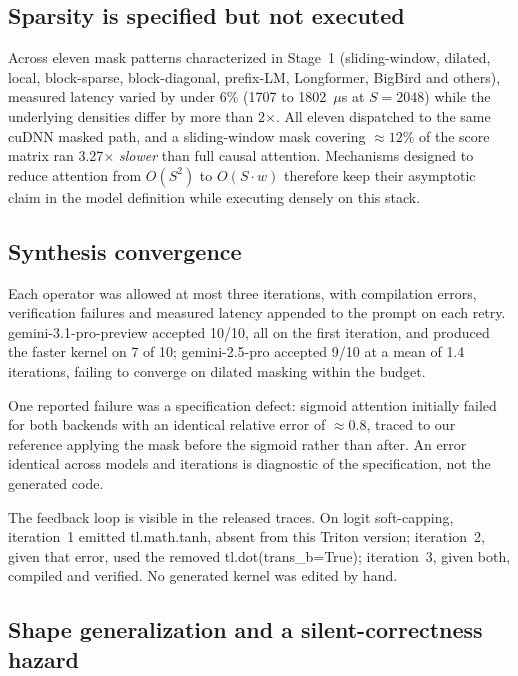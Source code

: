 \documentclass[10pt,twocolumn]{article}
\begin{document}
\subsection{Sparsity is specified but not executed}

Across eleven mask patterns characterized in Stage~1 (sliding-window, dilated, local,
block-sparse, block-diagonal, prefix-LM, Longformer, BigBird and others), measured
latency varied by under 6\% (1707 to 1802~$\mu$s at $S{=}2048$) while the underlying
densities differ by more than 2$\times$. All eleven dispatched to the same cuDNN masked
path, and a sliding-window mask covering ${\approx}12\%$ of the score matrix ran
3.27$\times$ \emph{slower} than full causal attention. Mechanisms designed to reduce
attention from $O(S^2)$ to $O(S\!\cdot\!w)$ therefore keep their asymptotic claim in the
model definition while executing densely on this stack.

\subsection{Synthesis convergence}

Each operator was allowed at most three iterations, with compilation errors,
verification failures and measured latency appended to the prompt on each retry.
gemini-3.1-pro-preview accepted 10/10, all on the first iteration, and produced
the faster kernel on 7 of 10; gemini-2.5-pro accepted 9/10 at a mean of 1.4
iterations, failing to converge on dilated masking within the budget.

One reported failure was a specification defect: sigmoid attention initially failed for
both backends with an identical relative error of ${\approx}0.8$, traced to our reference
applying the mask before the sigmoid rather than after. An error identical across models
and iterations is diagnostic of the specification, not the generated code.

The feedback loop is visible in the released traces. On logit soft-capping,
iteration~1 emitted tl.math.tanh, absent from this Triton version; iteration~2,
given that error, used the removed tl.dot(trans\_b=True); iteration~3, given
both, compiled and verified. No generated kernel was edited by hand.

\subsection{Shape generalization and a silent-correctness hazard}
\end{document}
